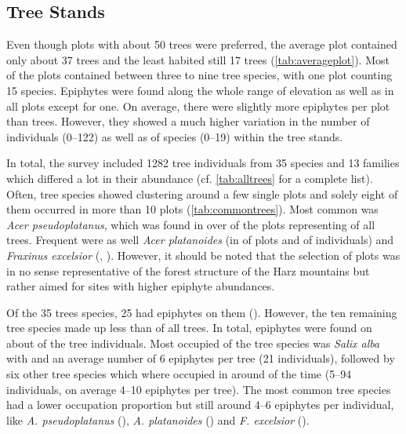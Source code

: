 \documentclass[12pt, a4paper, oneside, draft]{scrartcl}
\begin{document}

	
	\subsection{Tree Stands}
	Even though plots with about 50 trees were preferred, the average plot contained only about 37 trees and the least habited still 17 trees (\autoref{tab:averageplot}). Most of the plots contained between three to nine tree species, with one plot counting 15 species. Epiphytes were found along the whole range of elevation as well as in all plots except for one. On average, there were slightly more epiphytes per plot than trees. However, they showed a much higher variation in the number of individuals (0--122) as well as of species (0--19) within the tree stands. 
	
	
	
	In total, the survey included 1282 tree individuals from 35 species and 13 families which differed a lot in their abundance (cf. \autoref{tab:alltrees} for a complete list).  Often, tree species showed clustering around a few single plots and solely eight of them occurred in more than 10 plots (\autoref{tab:commontrees}). Most common was \textit{Acer pseudoplatanus}, which was found in over  of the plots representing  of all trees. Frequent were as well \textit{Acer platanoides} (in  of plots and  of individuals) and \textit{Fraxinus excelsior} (, ). However, it should be noted that the selection of plots was in no sense representative of the forest structure of the Harz mountains but rather aimed for sites with higher epiphyte abundances.
	
	Of the 35 trees species, 25 had epiphytes on them (). However, the ten remaining tree species made up less than  of all trees. In total, epiphytes were found on about  of the tree individuals. Most occupied of the tree species was \textit{Salix alba} with  and an average number of 6 epiphytes per tree (21 individuals), followed by six other tree species which where occupied in around  of the time (5--94 individuals, on average 4--10 epiphytes per tree). The most common tree species had a lower occupation proportion but still around 4--6 epiphytes per individual, like \textit{A. pseudoplatanus} (), \textit{A. platanoides} () and \textit{F. excelsior} ().
	
\end{document}
